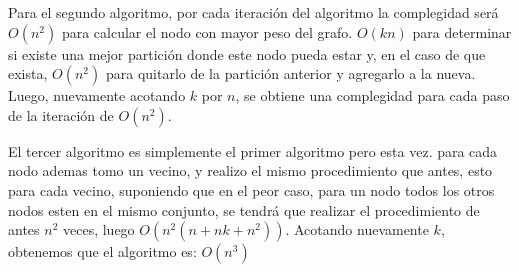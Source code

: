 Para el segundo algoritmo, por cada iteración del algoritmo la complegidad será $O(n^2)$ para calcular el nodo con mayor peso del grafo. $O(k n)$ para determinar si existe una mejor partición donde este nodo pueda estar y, en el caso de que exista, $O(n^2)$ para quitarlo de la partición anterior y agregarlo a la nueva. Luego, nuevamente acotando $k$ por $n$, se obtiene una complegidad para cada paso de la iteración de $O(n^2)$.

El tercer algoritmo es simplemente el primer algoritmo pero esta vez. para cada nodo ademas tomo un vecino, y realizo el mismo procedimiento que antes, esto para cada vecino, suponiendo que en el peor caso, para un nodo todos los otros nodos esten en el mismo conjunto, se tendrá que realizar el procedimiento de antes $n^2$ veces, luego $O(n^2 (n + n k + n^2))$. Acotando nuevamente $k$, obtenemos que el algoritmo es: $O(n^3)$


